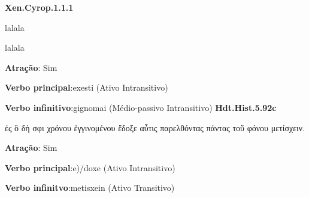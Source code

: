 \usepackage[T1]{fontenc}

\usepackage[utf8]{inputenc}


\textbf{Xen.Cyrop.1.1.1}

lalala

lalala

\textbf{Atração}: Sim

\textbf{Verbo principal}:exesti (Ativo Intransitivo)

\textbf{Verbo infinitivo}:gignomai (Médio-passivo Intransitivo)
\textbf{Hdt.Hist.5.92c}

ἐς ὃ δή σφι χρόνου ἐγγινομένου ἔδοξε αὖτις παρελθόντας πάντας τοῦ φόνου μετίσχειν.




\textbf{Atração}: Sim

\textbf{Verbo principal}:e)/doxe (Ativo Intransitivo)

\textbf{Verbo infinitvo}:metisxein (Ativo Transitivo)

